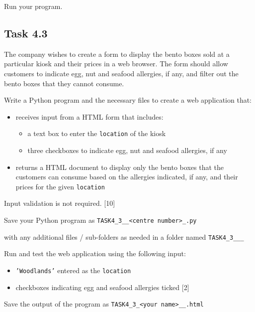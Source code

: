 \noindent Run your program.

\subsection*{Task 4.3}

\noindent The company wishes to create a form to display the bento
boxes sold at a particular kiosk and their prices in a web browser.
The form should allow customers to indicate egg, nut and seafood allergies,
if any, and filter out the bento boxes that they cannot consume.

\noindent Write a Python program and the necessary files to create
a web application that:
\begin{itemize}
\item receives input from a HTML form that includes:
\begin{itemize}
\item a text box to enter the \texttt{location} of the kiosk 
\item three checkboxes to indicate egg, nut and seafood allergies, if any
\end{itemize}
\item returns a HTML document to display only the bento boxes that the customers
can consume based on the allergies indicated, if any, and their prices
for the given \texttt{location}
\end{itemize}
\noindent Input validation is not required. \hfill{}{[}10{]}

\noindent Save your Python program as \texttt{TASK4\_3\_<your name>\_<centre
number>\_<index number>.py}

\noindent with any additional files / sub-folders as needed in a folder
named \texttt{TASK4\_3\_<your name>\_<centre number>\_<index number>}

\noindent Run and test the web application using the following input:
\begin{itemize}
\item \texttt{'Woodlands'} entered as the \texttt{location} 
\item checkboxes indicating egg and seafood allergies ticked \hfill{}{[}2{]}
\end{itemize}
\noindent Save the output of the program as \texttt{TASK4\_3\_<your
name>\_<centre number>\_<index number>.html }